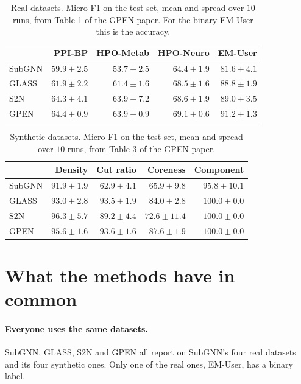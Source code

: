 \documentclass[11pt]{article}
\begin{document}
\begin{table}[H]
\centering
\small
\begin{tabular}{lrrrr}
\toprule
 & PPI-BP & HPO-Metab & HPO-Neuro & EM-User \\
\midrule
SubGNN & $59.9 \pm 2.5$ & $53.7 \pm 2.5$ & $64.4 \pm 1.9$ & $81.6 \pm 4.1$ \\
GLASS & $61.9 \pm 2.2$ & $61.4 \pm 1.6$ & $68.5 \pm 1.6$ & $88.8 \pm 1.9$ \\
S2N & $64.3 \pm 4.1$ & $\mathbf{63.9 \pm 7.2}$ & $68.6 \pm 1.9$ & $89.0 \pm 3.5$ \\
GPEN & $\mathbf{64.4 \pm 0.9}$ & $\mathbf{63.9 \pm 0.9}$ & $\mathbf{69.1 \pm 0.6}$ & $\mathbf{91.2 \pm 1.3}$ \\
\bottomrule
\end{tabular}
\caption{Real datasets. Micro-F1 on the test set, mean and spread over $10$ runs, from
Table 1 of the GPEN paper. For the binary EM-User this is the accuracy.}
\end{table}

\begin{table}[H]
\centering
\small
\begin{tabular}{lrrrr}
\toprule
 & Density & Cut ratio & Coreness & Component \\
\midrule
SubGNN & $91.9 \pm 1.9$ & $62.9 \pm 4.1$ & $65.9 \pm 9.8$ & $95.8 \pm 10.1$ \\
GLASS & $93.0 \pm 2.8$ & $93.5 \pm 1.9$ & $84.0 \pm 2.8$ & $\mathbf{100.0 \pm 0.0}$ \\
S2N & $\mathbf{96.3 \pm 5.7}$ & $89.2 \pm 4.4$ & $72.6 \pm 11.4$ & $\mathbf{100.0 \pm 0.0}$ \\
GPEN & $95.6 \pm 1.6$ & $\mathbf{93.6 \pm 1.6}$ & $\mathbf{87.6 \pm 1.9}$ & $\mathbf{100.0 \pm 0.0}$ \\
\bottomrule
\end{tabular}
\caption{Synthetic datasets. Micro-F1 on the test set, mean and spread over $10$ runs, from
Table 3 of the GPEN paper.}
\end{table}

\section*{What the methods have in common}

\paragraph{Everyone uses the same datasets.} SubGNN, GLASS, S2N and GPEN all report on
SubGNN's four real datasets and its four synthetic ones. Only one of the real ones, EM-User,
has a binary label.
\end{document}
